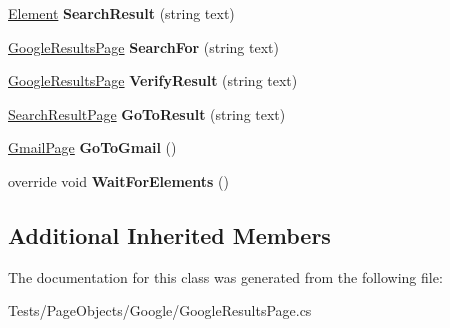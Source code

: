 \begin{DoxyCompactItemize}
\item 
\hypertarget{class_proto_test_1_1_golem_1_1_tests_1_1_page_objects_1_1_google_1_1_google_results_page_a57fa6369ee094a8907486d1a7afcc960}{\hyperlink{class_proto_test_1_1_golem_1_1_web_driver_1_1_element}{Element} {\bfseries Search\-Result} (string text)}\label{class_proto_test_1_1_golem_1_1_tests_1_1_page_objects_1_1_google_1_1_google_results_page_a57fa6369ee094a8907486d1a7afcc960}

\item 
\hypertarget{class_proto_test_1_1_golem_1_1_tests_1_1_page_objects_1_1_google_1_1_google_results_page_a6e66cec9e92a206283144508c56f9e32}{\hyperlink{class_proto_test_1_1_golem_1_1_tests_1_1_page_objects_1_1_google_1_1_google_results_page}{Google\-Results\-Page} {\bfseries Search\-For} (string text)}\label{class_proto_test_1_1_golem_1_1_tests_1_1_page_objects_1_1_google_1_1_google_results_page_a6e66cec9e92a206283144508c56f9e32}

\item 
\hypertarget{class_proto_test_1_1_golem_1_1_tests_1_1_page_objects_1_1_google_1_1_google_results_page_a58b1adc0ede77daa369150116940e5c3}{\hyperlink{class_proto_test_1_1_golem_1_1_tests_1_1_page_objects_1_1_google_1_1_google_results_page}{Google\-Results\-Page} {\bfseries Verify\-Result} (string text)}\label{class_proto_test_1_1_golem_1_1_tests_1_1_page_objects_1_1_google_1_1_google_results_page_a58b1adc0ede77daa369150116940e5c3}

\item 
\hypertarget{class_proto_test_1_1_golem_1_1_tests_1_1_page_objects_1_1_google_1_1_google_results_page_a989b0dc8ac6f5ed77b962141964b2ee9}{\hyperlink{class_proto_test_1_1_golem_1_1_tests_1_1_page_objects_1_1_google_1_1_search_result_page}{Search\-Result\-Page} {\bfseries Go\-To\-Result} (string text)}\label{class_proto_test_1_1_golem_1_1_tests_1_1_page_objects_1_1_google_1_1_google_results_page_a989b0dc8ac6f5ed77b962141964b2ee9}

\item 
\hypertarget{class_proto_test_1_1_golem_1_1_tests_1_1_page_objects_1_1_google_1_1_google_results_page_a72242b82dfc5ebd71dc74142020065d3}{\hyperlink{class_proto_test_1_1_golem_1_1_tests_1_1_page_objects_1_1_google_1_1_gmail_page}{Gmail\-Page} {\bfseries Go\-To\-Gmail} ()}\label{class_proto_test_1_1_golem_1_1_tests_1_1_page_objects_1_1_google_1_1_google_results_page_a72242b82dfc5ebd71dc74142020065d3}

\item 
\hypertarget{class_proto_test_1_1_golem_1_1_tests_1_1_page_objects_1_1_google_1_1_google_results_page_a965c03050c819018d54fdaad720385f6}{override void {\bfseries Wait\-For\-Elements} ()}\label{class_proto_test_1_1_golem_1_1_tests_1_1_page_objects_1_1_google_1_1_google_results_page_a965c03050c819018d54fdaad720385f6}

\end{DoxyCompactItemize}
\subsection*{Additional Inherited Members}


The documentation for this class was generated from the following file\-:\begin{DoxyCompactItemize}
\item 
Tests/\-Page\-Objects/\-Google/Google\-Results\-Page.\-cs\end{DoxyCompactItemize}
